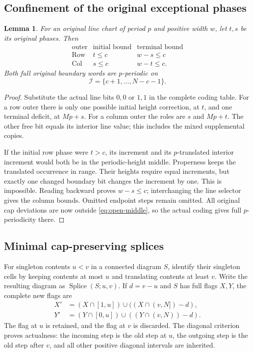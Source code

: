 \documentclass[11pt,a4paper]{amsart}
\numberwithin{equation}{section}
\theoremstyle{plain}
\newtheorem{lemma}[theorem]{Lemma}
\theoremstyle{definition}
\newcommand{\Row}{\operatorname{Row}}
\newcommand{\Col}{\operatorname{Col}}
\newcommand{\Splice}{\operatorname{Splice}}
\begin{document}
\subsection{Confinement of the original exceptional phases}

\begin{lemma}\label{lem:phase-confinement}
For an original line chart of period \(p\) and positive width \(w\), let \(t,s\)
be its original phases.  Then
\[
 \begin{array}{c|cc}
 \text{outer}&\text{initial bound}&\text{terminal bound}\\\hline
 \Row&t\le c&w-s\le c\\
 \Col&s\le c&w-t\le c.
 \end{array}
\]
Both full original boundary words are \(p\)-periodic on
\begin{equation}\label{eq:open-middle}
 \mathcal I=\{c+1,\ldots,N-c-1\}.
\end{equation}
\end{lemma}
\begin{proof}
Substitute the actual line bits \(0,0\) or \(1,1\) in the complete coding table.
For a row outer there is only one possible initial height correction, at
\(t\), and one terminal deficit, at \(Mp+s\).  For a column outer the roles are
\(s\) and \(Mp+t\).  The other free bit equals its interior line value; this
includes the mixed supplemental copies.

If the initial row phase were \(t>c\), its increment and its \(p\)-translated
interior increment would both be in the periodic-height middle.  Properness
keeps the translated occurrence in range.  Their heights require equal
increments, but exactly one changed boundary bit changes the increment by
one.  This is impossible.  Reading backward proves \(w-s\le c\); interchanging
the line selector gives the column bounds.  Omitted endpoint steps remain
omitted.  All original cap deviations are now outside \eqref{eq:open-middle},
so the actual coding gives full \(p\)-periodicity there.
\end{proof}

\subsection{Minimal cap-preserving splices}

For singleton contents \(u<v\) in a connected diagram \(S\), identify their
singleton cells by keeping contents at most \(u\) and translating contents
at least \(v\).  Write the resulting diagram as \(\Splice(S;u,v)\).
If \(d=v-u\) and \(S\) has full flags \(X,Y\), the complete new flags are
\[
 \begin{aligned}
 X'&=(X\cap[1,u])\cup((X\cap(v,N])-d),\\
 Y'&=(Y\cap[0,u])\cup((Y\cap(v,N))-d).
 \end{aligned}
\]
The flag at \(u\) is retained, and the flag at \(v\) is discarded.
The diagonal criterion proves actualness: the incoming step is the old
step at \(u\), the outgoing step is the old step after \(v\), and all other
positive diagonal intervals are inherited.
\end{document}
